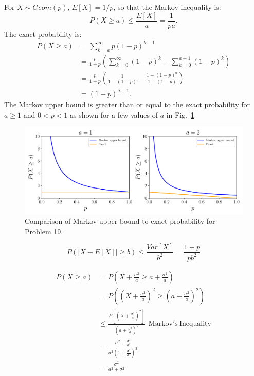 \begin{problem}{19}  For $X\sim Geom(p)$, $E[X] = 1/p$, so that the Markov inequality is:
\begin{equation*}
P(X \ge a) \le \frac{E[X]}{a} = \frac{1}{pa}.
\end{equation*}
The exact probability is:
\begin{align*}
P(X \ge a) &= \sum_{k=a}^\infty p(1-p)^{k-1}\\
& = \frac{p}{1-p}\left(\sum_{k=0}^\infty (1-p)^{k}-\sum_{k=0}^{a-1} (1-p)^{k} \right) \\
& = \frac{p}{1-p}\left(\frac{1}{1-(1-p)}-\frac{1-(1-p)^a}{1-(1-p)}\right) \\
&=(1-p)^{a-1}.
\end{align*}
The Markov upper bound is greater than or equal to the exact probability for $a \ge 1$ and $0<p<1$ as shown for a few values of $a$ in Fig.~\ref{fig:prob_19}

	\begin{figure}[t]
	\centering
      		 \includegraphics[totalheight=6cm]{chpt6/prob19.pdf}
  			  \caption{Comparison of Markov upper bound to exact probability for Problem 19.}
    			   \label{fig:prob_19}
	\end{figure}
\end{problem}

\begin{problem}{20}

\begin{equation*}
P(|X-E[X]|\ge b)\le \frac{Var[X]}{b^2} = \frac{1-p}{pb^2}
\end{equation*}

\end{problem}

\begin{problem}{21}
\begin{align*}
P(X \ge a) &= P\left(X+\frac{\sigma^2}{a} \ge a+\frac{\sigma^2}{a}\right) \\
&=P\left(\left(X+\frac{\sigma^2}{a}\right)^2 \ge \left (a+\frac{\sigma^2}{a} \right)^2\right) \\
& \le \frac{E\left[(X+\frac{\sigma^2}{a})^2\right]}{\left(a+\frac{\sigma^2}{a}\right)^2}~~\mathrm{Markov's~Inequality} \\
&=\frac{\sigma^2+\frac{\sigma^4}{a^2}}{a^2(1+\frac{\sigma^2}{a^2})^2} \\
& = \frac{\sigma^2}{a^2+\sigma^2}
\end{align*}

\end{problem}

